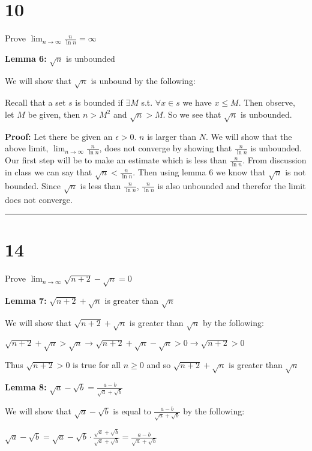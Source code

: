 \documentclass[12pt]{article}
\newcommand{\imp}{\rightarrow}
\newcommand\qedsym{\hfill \rule{2mm}{2mm}}
\begin{document}
\section*{10}
Prove $\lim_{n\to \infty}\frac{n}{\ln n} = \infty$

\bigskip

\textbf{Lemma 6:} $\sqrt{n}$ is unbounded

We will show that $\sqrt{n}$ is unbound by the following:

Recall that a set $s$ is bounded if $\exists M$ s.t. $\forall x\in s$ we have $x\leq M$. Then observe, let $M$ be given, then $n > M^2$ and $\sqrt{n} > M$. So we see that $\sqrt{n}$ is unbounded.

\bigskip

\textbf{Proof:} Let there be given an $\epsilon > 0$. $n$ is larger than $N$. We will show that the above limit, $\lim_{n\to \infty}\frac{n}{\ln n}$, does not converge by showing that $\frac{n}{\ln n}$ is unbounded. Our first step will be to make an estimate which is less than $\frac{n}{\ln n}$. From discussion in class we can say that $\sqrt{n} < \frac{n}{\ln n}$. Then using lemma 6 we know that $\sqrt{n}$ is not bounded. Since $\sqrt{n}$ is less than $\frac{n}{\ln n}$, $\frac{n}{\ln n}$ is also unbounded and therefor the limit does not converge.\qedsym{}

\section*{14}
Prove $\lim_{n\to \infty} \sqrt{n+2} - \sqrt{n} = 0$

\bigskip

\textbf{Lemma 7:} $\sqrt{n+2} + \sqrt{n}$ is greater than $\sqrt{n}$

We will show that $\sqrt{n+2} + \sqrt{n}$ is greater than $\sqrt{n}$ by the following:

$\sqrt{n+2} + \sqrt{n} > \sqrt{n}
  \imp \sqrt{n+2} + \sqrt{n} - \sqrt{n} > 0
  \imp \sqrt{n+2} > 0$

Thus $\sqrt{n+2} > 0$ is true for all $n \geq 0$ and so $\sqrt{n+2} + \sqrt{n}$ is greater than $\sqrt{n}$

\bigskip

\textbf{Lemma 8:} $\sqrt{a} - \sqrt{b} = \frac{a - b}{\sqrt{a} + {\sqrt{b}}}$

We will show that $\sqrt{a} - \sqrt{b}$ is equal to $\frac{a - b}{\sqrt{a} + {\sqrt{b}}}$ by the following:

$\sqrt{a} - \sqrt{b}
  = \sqrt{a} - \sqrt{b} \cdot \frac{\sqrt{a} + \sqrt{b}}{\sqrt{a} + \sqrt{b}}
  = \frac{a - b}{\sqrt{a} + {\sqrt{b}}}$
\end{document}
